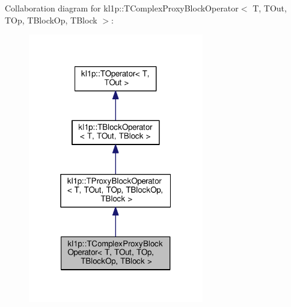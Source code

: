 Collaboration diagram for kl1p\+:\+:T\+Complex\+Proxy\+Block\+Operator$<$ T, T\+Out, T\+Op, T\+Block\+Op, T\+Block $>$\+:
\nopagebreak
\begin{figure}[H]
\begin{center}
\leavevmode
\includegraphics[width=217pt]{classkl1p_1_1TComplexProxyBlockOperator__coll__graph}
\end{center}
\end{figure}
